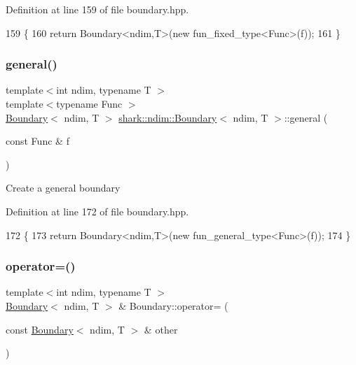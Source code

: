 Definition at line 159 of file boundary.\+hpp.


\begin{DoxyCode}
159                                                               \{
160             \textcolor{keywordflow}{return} Boundary<ndim,T>(\textcolor{keyword}{new} fun\_fixed\_type<Func>(f));
161         \}
\end{DoxyCode}
\hypertarget{classshark_1_1ndim_1_1_boundary_a1820cabb4bd234cd1e08179f39bf5a8d}{}\label{classshark_1_1ndim_1_1_boundary_a1820cabb4bd234cd1e08179f39bf5a8d} 
\subsubsection{\texorpdfstring{general()}{general()}}
{\footnotesize\ttfamily template$<$int ndim, typename T $>$ \\
template$<$typename Func $>$ \\
\hyperlink{classshark_1_1ndim_1_1_boundary}{Boundary}$<$ ndim, T $>$ \hyperlink{classshark_1_1ndim_1_1_boundary}{shark\+::ndim\+::\+Boundary}$<$ ndim, T $>$\+::general (\begin{DoxyParamCaption}\item[{const Func \&}]{f }\end{DoxyParamCaption})\hspace{0.3cm}{\ttfamily [static]}}

Create a general boundary 

Definition at line 172 of file boundary.\+hpp.


\begin{DoxyCode}
172                                                                 \{
173             \textcolor{keywordflow}{return} Boundary<ndim,T>(\textcolor{keyword}{new} fun\_general\_type<Func>(f));
174         \}
\end{DoxyCode}
\hypertarget{classshark_1_1ndim_1_1_boundary_afbdf2a3d58ac7c831e5911c6ff86cfb8}{}\label{classshark_1_1ndim_1_1_boundary_afbdf2a3d58ac7c831e5911c6ff86cfb8} 
\subsubsection{\texorpdfstring{operator=()}{operator=()}}
{\footnotesize\ttfamily template$<$int ndim, typename T $>$ \\
\hyperlink{classshark_1_1ndim_1_1_boundary}{Boundary}$<$ ndim, T $>$ \& Boundary\+::operator= (\begin{DoxyParamCaption}\item[{const \hyperlink{classshark_1_1ndim_1_1_boundary}{Boundary}$<$ ndim, T $>$ \&}]{other }\end{DoxyParamCaption})}



